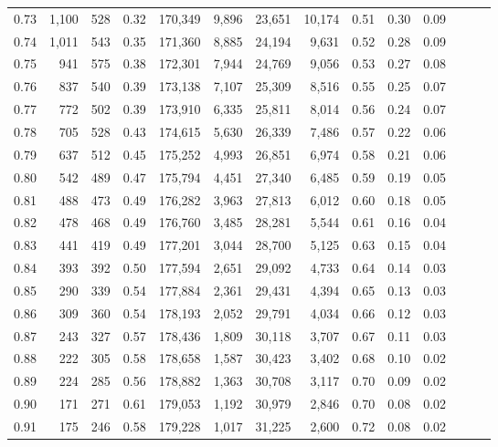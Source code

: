 \begin{tabular}{rrrrrrrrrrrrrr}
0.73 &  1,100 &  528 &  0.32 &  170,349 &    9,896 &  23,651 &  10,174 &  0.51 &  0.30 &      0.09 \\
0.74 &  1,011 &  543 &  0.35 &  171,360 &    8,885 &  24,194 &   9,631 &  0.52 &  0.28 &      0.09 \\
0.75 &    941 &  575 &  0.38 &  172,301 &    7,944 &  24,769 &   9,056 &  0.53 &  0.27 &      0.08 \\
0.76 &    837 &  540 &  0.39 &  173,138 &    7,107 &  25,309 &   8,516 &  0.55 &  0.25 &      0.07 \\
0.77 &    772 &  502 &  0.39 &  173,910 &    6,335 &  25,811 &   8,014 &  0.56 &  0.24 &      0.07 \\
0.78 &    705 &  528 &  0.43 &  174,615 &    5,630 &  26,339 &   7,486 &  0.57 &  0.22 &      0.06 \\
0.79 &    637 &  512 &  0.45 &  175,252 &    4,993 &  26,851 &   6,974 &  0.58 &  0.21 &      0.06 \\
0.80 &    542 &  489 &  0.47 &  175,794 &    4,451 &  27,340 &   6,485 &  0.59 &  0.19 &      0.05 \\
0.81 &    488 &  473 &  0.49 &  176,282 &    3,963 &  27,813 &   6,012 &  0.60 &  0.18 &      0.05 \\
0.82 &    478 &  468 &  0.49 &  176,760 &    3,485 &  28,281 &   5,544 &  0.61 &  0.16 &      0.04 \\
0.83 &    441 &  419 &  0.49 &  177,201 &    3,044 &  28,700 &   5,125 &  0.63 &  0.15 &      0.04 \\
0.84 &    393 &  392 &  0.50 &  177,594 &    2,651 &  29,092 &   4,733 &  0.64 &  0.14 &      0.03 \\
0.85 &    290 &  339 &  0.54 &  177,884 &    2,361 &  29,431 &   4,394 &  0.65 &  0.13 &      0.03 \\
0.86 &    309 &  360 &  0.54 &  178,193 &    2,052 &  29,791 &   4,034 &  0.66 &  0.12 &      0.03 \\
0.87 &    243 &  327 &  0.57 &  178,436 &    1,809 &  30,118 &   3,707 &  0.67 &  0.11 &      0.03 \\
0.88 &    222 &  305 &  0.58 &  178,658 &    1,587 &  30,423 &   3,402 &  0.68 &  0.10 &      0.02 \\
0.89 &    224 &  285 &  0.56 &  178,882 &    1,363 &  30,708 &   3,117 &  0.70 &  0.09 &      0.02 \\
0.90 &    171 &  271 &  0.61 &  179,053 &    1,192 &  30,979 &   2,846 &  0.70 &  0.08 &      0.02 \\
0.91 &    175 &  246 &  0.58 &  179,228 &    1,017 &  31,225 &   2,600 &  0.72 &  0.08 &      0.02 \\

\end{tabular}
